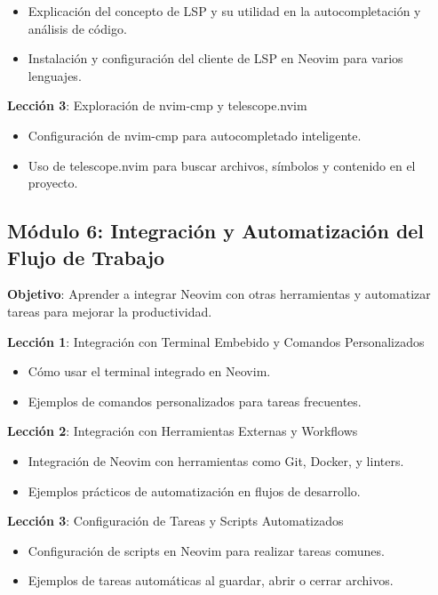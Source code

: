 \documentclass[
  a4paper,
  DIV=11,
  numbers=noendperiod,
  onepage,
  openany]{scrreprt}
\begin{document}
\begin{itemize}
\item
  Explicación del concepto de LSP y su utilidad en la autocompletación y
  análisis de código.
\item
  Instalación y configuración del cliente de LSP en Neovim para varios
  lenguajes.
\end{itemize}

\textbf{Lección 3}: Exploración de nvim-cmp y telescope.nvim

\begin{itemize}
\item
  Configuración de nvim-cmp para autocompletado inteligente.
\item
  Uso de telescope.nvim para buscar archivos, símbolos y contenido en el
  proyecto.
\end{itemize}

\subsection{\texorpdfstring{\textbf{Módulo 6}: Integración y
Automatización del Flujo de
Trabajo}{Módulo 6: Integración y Automatización del Flujo de Trabajo}}\label{muxf3dulo-6-integraciuxf3n-y-automatizaciuxf3n-del-flujo-de-trabajo}

\textbf{Objetivo}: Aprender a integrar Neovim con otras herramientas y
automatizar tareas para mejorar la productividad.

\textbf{Lección 1}: Integración con Terminal Embebido y Comandos
Personalizados

\begin{itemize}
\item
  Cómo usar el terminal integrado en Neovim.
\item
  Ejemplos de comandos personalizados para tareas frecuentes.
\end{itemize}

\textbf{Lección 2}: Integración con Herramientas Externas y Workflows

\begin{itemize}
\item
  Integración de Neovim con herramientas como Git, Docker, y linters.
\item
  Ejemplos prácticos de automatización en flujos de desarrollo.
\end{itemize}

\textbf{Lección 3}: Configuración de Tareas y Scripts Automatizados

\begin{itemize}
\item
  Configuración de scripts en Neovim para realizar tareas comunes.
\item
  Ejemplos de tareas automáticas al guardar, abrir o cerrar archivos.
\end{itemize}
\end{document}
